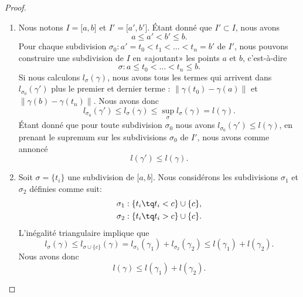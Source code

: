 \begin{proof}
	\begin{enumerate}
		\item
		      Nous notons $I=\mathopen[ a , b \mathclose]$ et $I'=\mathopen[ a' , b' \mathclose]$. Étant donné que $I'\subset I$, nous avons
		      \begin{equation}
			      a\leq a'<b'\leq b.
		      \end{equation}
		      Pour chaque subdivision $\sigma_0:a'=t_0<t_1<\ldots<t_n=b'$ de $I'$, nous pouvons construire une subdivision de $I$ en «ajoutant» les points $a$ et $b$, c'est-à-dire
		      \begin{equation}
			      \sigma:a\leq t_0<\ldots<t_n\leq b.
		      \end{equation}
		      Si nous calculons $l_{\sigma}(\gamma)$, nous avons tous les termes qui arrivent dans $l_{\sigma_0}(\gamma')$ plus le premier et dernier terme : $\| \gamma(t_0)-\gamma(a) \|$ et $\| \gamma(b)-\gamma(t_n)\|$. Nous avons donc
		      \begin{equation}
			      l_{\sigma_0}(\gamma')\leq l_{\sigma}(\gamma)\leq\sup_{\sigma}l_{\sigma}(\gamma)=l(\gamma).
		      \end{equation}
		      Étant donné que pour toute subdivision $\sigma_0$ nous avons $l_{\sigma_0}(\gamma')\leq l(\gamma)$, en prenant le supremum sur les subdivisions $\sigma_0$ de $I'$, nous avons comme annoncé
		      \begin{equation}
			      l(\gamma')\leq l(\gamma).
		      \end{equation}
		\item
		      Soit $\sigma=\{ t_i \}$ une subdivision de $\mathopen[ a , b \mathclose]$. Nous considérons les subdivisions $\sigma_1$ et $\sigma_2$ définies comme suit:
		      \begin{equation}
			      \begin{aligned}[]
				      \sigma_1 & :\{ t_i\tq t_i< c \}\cup\{ c \}, \\
				      \sigma_2 & :\{ t_i\tq t_i> c \}\cup\{ c \}.
			      \end{aligned}
		      \end{equation}
		      L'inégalité triangulaire implique que
		      \begin{equation}
			      l_{\sigma}(\gamma)\leq l_{\sigma\cup\{ c \}}(\gamma)=l_{\sigma_1}(\gamma_1)+l_{\sigma_2}(\gamma_2)\leq l(\gamma_1)+l(\gamma_2).
		      \end{equation}
		      Nous avons donc
		      \begin{equation}    \label{EqIneglglglgud}
			      l(\gamma)\leq l(\gamma_1)+l(\gamma_2).
		      \end{equation}


\end{enumerate}
\end{proof}
